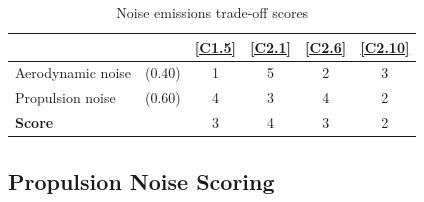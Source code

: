 \begin{table}[ht]
\centering
\caption{Noise emissions trade-off scores}
\label{tab:trade-off_Sustainability}
\begin{tabular}{lr|cccc}
\toprule
                    &     & \textbf{\ref{C1.5}} & \textbf{\ref{C2.1}} & \textbf{\ref{C2.6}} & \textbf{\ref{C2.10}} \\ \bottomrule
Aerodynamic noise &(0.40) & \cellcolor[HTML]{FD6864}1    & \cellcolor[HTML]{63BE7B}5   & \cellcolor[HTML]{FCBF7B}2   & \cellcolor[HTML]{E0E383}3   \\
Propulsion noise &(0.60) & \cellcolor[HTML]{83C77D}4  & \cellcolor[HTML]{E0E383}3             & \cellcolor[HTML]{83C77D}4     & \cellcolor[HTML]{FCBF7B}2                  \\ \hline
\textbf{Score}       &       & \cellcolor[HTML]{E0E383}3 & \cellcolor[HTML]{83C77D}4 & \cellcolor[HTML]{E0E383}3 & \cellcolor[HTML]{FCBF7B}2 \\ \toprule
\end{tabular}
\end{table}

\subsection{Propulsion Noise Scoring}


